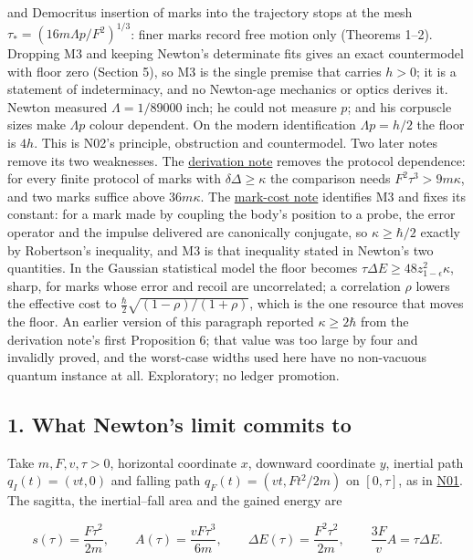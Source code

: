\documentclass[11pt,a4paper]{article}
\begin{document}
and Democritus insertion of marks into the trajectory stops at the mesh
\(\tau_*=(16m\Lambda p/F^2)^{1/3}\): finer marks record free motion only
(Theorems 1--2). Dropping M3 and keeping Newton's determinate fits gives
an exact countermodel with floor zero (Section 5), so M3 is the single
premise that carries \(h>0\); it is a statement of indeterminacy, and no
Newton-age mechanics or optics derives it. Newton measured
\(\Lambda=1/89000\) inch; he could not measure \(p\); and his corpuscle
sizes make \(\Lambda p\) colour dependent. On the modern identification
\(\Lambda p=h/2\) the floor is \(4h\). This is N02's principle,
obstruction and countermodel. Two later notes remove its two weaknesses.
The \href{planck-gap-derivation.md}{derivation note} removes the
protocol dependence: for every finite protocol of marks with
\(\delta\Delta\ge\kappa\) the comparison needs \(F^2\tau^3>9m\kappa\),
and two marks suffice above \(36m\kappa\). The
\href{mark-cost-and-statistical-floor.md}{mark-cost note} identifies M3
and fixes its constant: for a mark made by coupling the body's position
to a probe, the error operator and the impulse delivered are canonically
conjugate, so \(\kappa\ge\hbar/2\) exactly by Robertson's inequality,
and M3 is that inequality stated in Newton's two quantities. In the
Gaussian statistical model the floor becomes
\(\tau\Delta E\ge48z_{1-\epsilon}^2\kappa\), sharp, for marks whose
error and recoil are uncorrelated; a correlation \(\rho\) lowers the
effective cost to \(\frac\hbar2\sqrt{(1-\rho)/(1+\rho)}\), which is the
one resource that moves the floor. An earlier version of this paragraph
reported \(\kappa\ge2\hbar\) from the derivation note's first
Proposition 6; that value was too large by four and invalidly proved,
and the worst-case widths used here have no non-vacuous quantum instance
at all. Exploratory; no ledger promotion.

\hypertarget{what-newtons-limit-commits-to}{%
\subsection{1. What Newton's limit commits
to}\label{what-newtons-limit-commits-to}}

Take \(m,F,v,\tau>0\), horizontal coordinate \(x\), downward coordinate
\(y\), inertial path \(q_I(t)=(vt,0)\) and falling path
\(q_F(t)=(vt,Ft^2/2m)\) on \([0,\tau]\), as in
\href{newton-insertion-action.md}{N01}. The sagitta, the inertial--fall
area and the gained energy are

\[s(\tau)=\frac{F\tau^2}{2m},\qquad A(\tau)=\frac{vF\tau^3}{6m},\qquad
\Delta E(\tau)=\frac{F^2\tau^2}{2m},\qquad \frac{3F}{v}A=\tau\Delta E .\]
\end{document}
